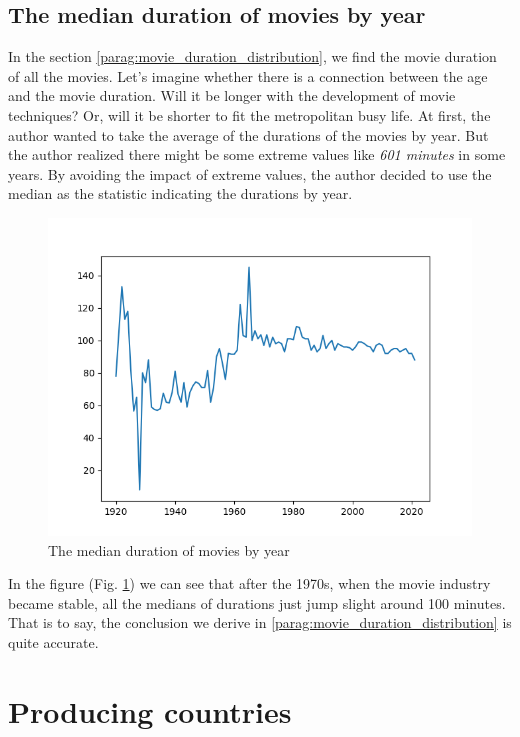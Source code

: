 \documentclass{article}
\begin{document}
\subsection{The median duration of movies by year}

In the section \ref{parag:movie_duration_distribution}, we find the movie duration
of all the movies. Let's imagine whether there is a connection between the age and 
the movie duration. Will it be longer with the development of movie techniques? 
Or, will it be shorter to fit the metropolitan busy life. At first, the author 
wanted to take the average of the durations of the movies by year. But the author 
realized there might be some extreme values like {\it 601 minutes} in some years. 
By avoiding the impact of extreme values, the author decided to use the median as 
the statistic indicating the durations by year.

\begin{figure}[!htb]
	\centering
	\includegraphics[scale=0.6]{../annual_movie_length_median.png}
	\caption{The median duration of movies by year}
	\label{fig:median_duration_by_year}
\end{figure}

In the figure (Fig. \ref{fig:median_duration_by_year}) we can see that after the 
1970s, when the movie industry became stable, all the medians of durations just 
jump slight around 100 minutes. That is to say, the conclusion we derive in 
\ref{parag:movie_duration_distribution} is quite accurate. 

\section{Producing countries}
\end{document}
